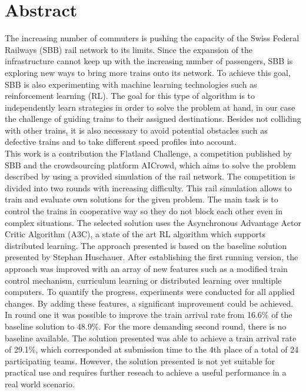 \chapter*{Abstract}\label{abstract}
The increasing number of commuters is pushing the capacity of the Swiss Federal Railways (SBB) rail network to its limits. Since the expansion of the infrastructure cannot keep up with the increasing number of passengers, SBB is exploring new ways to bring more trains onto its network. To achieve this goal, SBB is also experimenting with machine learning technologies such as reinforcement learning (RL). 
The goal for this type of algorithm is to independently learn strategies  in order to solve the problem at hand, in our case the challenge of guiding trains to their assigned destinations. Besides not colliding with other trains, it is also necessary to avoid potential obstacles such as defective trains and to take different speed profiles into account.\\
This work is a contribution the Flatland Challenge, a competition published by SBB and the crowdsourcing platform AICrowd, which aims to solve the problem described by using a provided simulation of the rail network. The competition is divided into two rounds with increasing difficulty. This rail simulation allows to train and evaluate own solutions for the given problem. The main task is to control the trains in cooperative way so they do not block each other even in complex situations. The selected solution uses the Asynchronous Advantage Actor Critic Algorithm (A3C), a state of the art RL algorithm which supports distributed learning. The approach presented is based on the baseline solution presented by Stephan Huschauer. After establishing the first running version, the approach was improved with an array of new features such as a modified train control mechanism, curriculum learning or distributed learning over multiple computers. To quantify the progress, experiments were conducted for all applied changes. By adding these features, a significant improvement could be achieved. In round one it was possible to improve the train arrival rate from 16.6\% of the baseline solution to 48.9\%.
For the more demanding second round, there is no baseline available. The solution presented was able to achieve a train arrival rate of 29.1\%, which corresponded at submission time to the 4th place of a total of 24 participating teams.
However, the solution presented is not yet suitable for practical use and requires further reseach to achieve a useful performance in a real world scenario.

